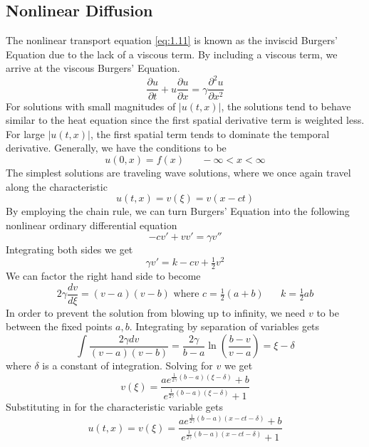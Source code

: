 \documentclass{article}
\newcommand{\pd}[2]{\frac{\partial #1}{\partial #2}}
\newcommand{\od}[2]{\frac{d #1}{d #2}}
\newcommand{\pdt}[2]{\frac{\partial ^2 #1}{\partial #2 ^2}}
\numberwithin{equation}{section}
\begin{document}
\subsection{Nonlinear Diffusion} 
The nonlinear transport equation \eqref{eq:1.11} is known as the inviscid Burgers' Equation due to the lack of a viscous term. By including a viscous term, we arrive at the viscous Burgers' Equation.
\begin{equation}
    \pd{u}{t}+u\pd{u}{x} = \gamma \pdt{u}{x}
\end{equation}
For solutions with small magnitudes of $|u(t,x)|$, the solutions tend to behave similar to the heat equation since the first spatial derivative term is weighted less. For large $|u(t,x)|$, the first spatial term tends to dominate the temporal derivative. Generally, we have the conditions to be 
\begin{equation*}
    u(0,x) = f(x) \hspace{20pt} -\infty<x<\infty
\end{equation*}
The simplest solutions are traveling wave solutions, where we once again travel along the characteristic 
\begin{equation*}
    u(t,x) = v(\xi) = v(x-ct)
\end{equation*}
By employing the chain rule, we can turn Burgers' Equation into the following nonlinear ordinary differential equation
\begin{equation}
    -cv'+vv'= \gamma v''
\end{equation}
Integrating both sides we get 
\begin{equation*}
    \gamma v' = k - cv+\tfrac{1}{2}v^2
\end{equation*}
We can factor the right hand side to become 
\begin{equation}
    2\gamma \od{v}{\xi} = (v-a)(v-b) \text{ where } c=\tfrac{1}{2}(a+b) \hspace{20pt} k=\tfrac{1}{2}ab
\end{equation}
In order to prevent the solution from blowing up to infinity, we need $v$ to be between the fixed points $a,b$. Integrating by separation of variables gets 
\begin{equation}
    \int\frac{2\gamma dv}{(v-a)(v-b)} = \frac{2\gamma}{b-a}\ln \left( \frac{b-v}{v-a} \right) = \xi -\delta
\end{equation}
where $\delta$ is a constant of integration. Solving for $v$ we get 
\begin{equation*}
    v(\xi) =\frac{ae^{\frac{1}{2\gamma}(b-a)(\xi-\delta)}+b}{e^{\frac{1}{2\gamma}(b-a)(\xi -\delta)}+1}
\end{equation*}
Substituting in for the characteristic variable gets 
\begin{equation}
    u(t,x) =v(\xi) =\frac{ae^{\frac{1}{2\gamma}(b-a)(x-ct-\delta)}+b}{e^{\frac{1}{2\gamma}(b-a)(x-ct -\delta)}+1}
\end{equation}
\end{document}
